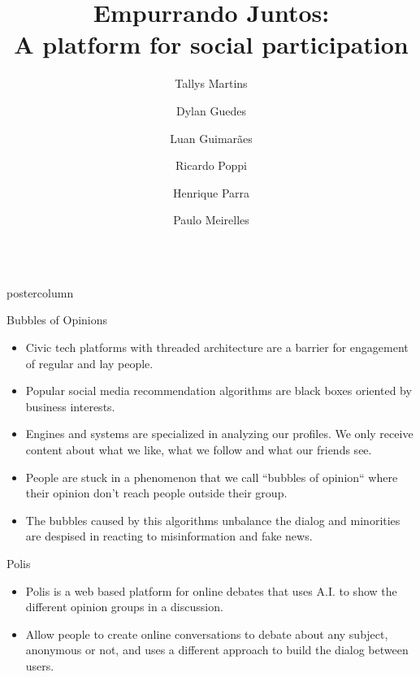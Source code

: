 \documentclass[final,hyperref={pdfpagelabels=false}]{beamer}
\title{\huge\bfseries\hspace*{-1em} Empurrando Juntos: \\A platform for social participation}
\date{}
\author{\large Tallys Martins
\and Dylan Guedes
\and Luan Guimarães \\
\and Ricardo Poppi
\and Henrique Parra
\and Paulo Meirelles
}
\institute[UNB/CD]{University of Brasília and Cidade Democrática Institute, Brazil}
\newlength{\columnheight}
\begin{document}
\begin{frame}
  \begin{columns}
    \begin{column}{.49\textwidth}
      \begin{beamercolorbox}[center,wd=\textwidth]{postercolumn}
        \begin{minipage}[T]{.95\textwidth}
          \parbox[t][\columnheight]{\textwidth}{

\begin{block}{Bubbles of Opinions}
  \begin{itemize}

    \item Civic tech platforms with threaded architecture are a barrier for
    engagement of regular and lay people. 

    \item Popular social media recommendation algorithms are black boxes 
    oriented by business interests.

    \item Engines and systems are specialized in analyzing our profiles. We only receive
    content about what we like, what we follow and what our friends see.

    \item People are stuck in a phenomenon that we call ``bubbles of opinion`` where
    their opinion don't reach people outside their group.

    \item The bubbles caused by this algorithms unbalance the dialog and minorities
    are despised in reacting to misinformation and fake news.
  \end{itemize}
\end{block}

\begin{block}{Polis}
  \begin{itemize}
    \item Polis is a web based platform for online debates that uses A.I. to
    show the different opinion groups in a discussion.

    \item Allow people to create online conversations to debate about any subject,
    anonymous or not, and uses a different approach to build the dialog between users.


\end{itemize}
\end{block}}
\end{minipage}
\end{beamercolorbox}
\end{column}
\end{columns}
\end{frame}
\end{document}
